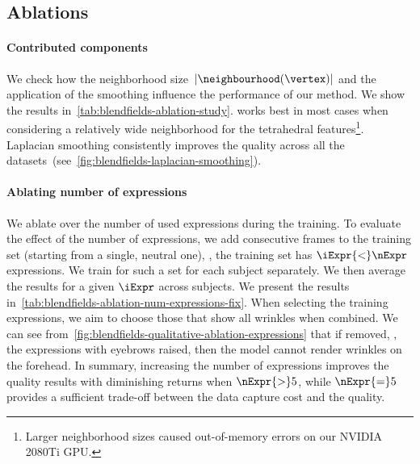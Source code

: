   \subsection{Ablations}

    \paragraph{Contributed components}
      We check how the neighborhood size~$|\neighbourhood(\vertex)|$ and the
      application of the smoothing influence the performance of our method.
      We show the results in~\cref{tab:blendfields-ablation-study}.
      \blendfields works best in most cases when considering a relatively wide neighborhood for the tetrahedral features\footnote{Larger neighborhood sizes caused out-of-memory errors on our NVIDIA 2080Ti GPU.}.
      Laplacian smoothing consistently improves the quality across all the
      datasets~(see~\cref{fig:blendfields-laplacian-smoothing}).

    \paragraph{Ablating number of expressions}
      We ablate over the number of used expressions during the training.
      To evaluate the effect of the number of expressions, we add consecutive frames
      to the training set (starting from a single, neutral one), \ie, the training
      set has $\iExpr{<}\nExpr$ expressions.
      We train \blendfields for such a set for each subject separately.
      We then average the results for a given $\iExpr$ across subjects.
      We present the results in~\cref{tab:blendfields-ablation-num-expressions-fix}.
      When selecting the training expressions, we aim to choose those that show all
      wrinkles when combined.
      We can see from~\cref{fig:blendfields-qualitative-ablation-expressions} that
      if removed, \eg, the expressions with eyebrows raised, then the model cannot
      render wrinkles on the forehead.
      In summary, increasing the number of expressions improves the quality results
      with diminishing returns when $\nExpr{>}5$, while $\nExpr{=}5$ provides a
      sufficient trade-off between the data capture cost and the quality.
      

